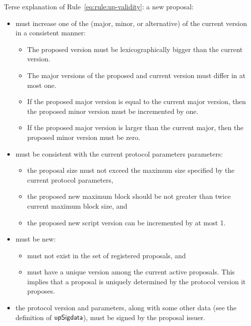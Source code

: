 Terse explanation of Rule~\ref{eq:rule:up-validity}: a new proposal:
\begin{itemize}
\item must increase one of the (major, minor, or alternative) of the
  current version in a consistent manner:
  \begin{itemize}
  \item The proposed version must be lexicographically bigger than the current
    version.
  \item The major versions of the proposed and current version must differ in
    at most one.
  \item If the proposed major version is equal to the current major
    version, then the proposed minor version must be incremented by one.
  \item If the proposed major version is larger than the current major, then
    the proposed minor version must be zero.
  \end{itemize}
\item must be consistent with the current protocol parameters parameters:
  \begin{itemize}
  \item the proposal size must not exceed the maximum size specified by
    the current protocol parameters,
  \item the proposed new maximum block should be not greater than twice current
    maximum block size, and
  \item the proposed new script version can be incremented by at most 1.
  \end{itemize}
\item must be new:
  \begin{itemize}
  \item must not exist in the set of registered proposals, and
  \item must have a unique version among the current active proposals. This
    implies that a proposal is uniquely determined by the protocol version it
    proposes.
  \end{itemize}
\item the protocol version and parameters, along with some other data (see the
  definition of $\mathsf{upSigdata}$), must be signed by the proposal issuer.
\end{itemize}


